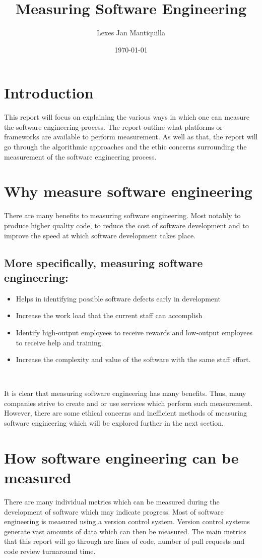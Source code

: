 \documentclass{article}
\title{Measuring Software Engineering}
\author{Lexes Jan Mantiquilla}
\date{\today}
\begin{document}
\maketitle
\tableofcontents
\newpage

\section{Introduction}
This report will focus on explaining the various ways in which one can measure
the software engineering process. The report outline what platforms or
frameworks are available to perform measurement. As well as that, the report
will go through the algorithmic approaches and the ethic concerns surrounding
the measurement of the software engineering process.

\section{Why measure software engineering}
There are many benefits to measuring software engineering. Most notably to
produce higher quality code, to reduce the cost of software development and to
improve the speed at which software development takes place.
\subsection{More specifically, measuring software engineering:}
\begin{itemize}
  \item Helps in identifying possible software defects early in development
  \item Increase the work load that the current staff can accomplish
  \item Identify high-output employees to receive rewards and low-output
    employees to receive help and training.
  \item Increase the complexity and value of the software with the same staff
    effort.
\end{itemize}
~\cite{scacchi1995understanding}

It is clear that measuring software engineering has many benefits. Thus, many
companies strive to create and or use services which perform such measurement.
However, there are some ethical concerns and inefficient methods of measuring
software engineering which will be explored further in the next section.

\section{How software engineering can be measured}
There are many individual metrics which can be measured during the development
of software which may indicate progress. Most of software engineering is
measured using a version control system. Version control systems generate vast
amounts of data which can then be measured. The main metrics that this report
will go through are lines of code, number of pull requests and code review
turnaround time.
\end{document}
